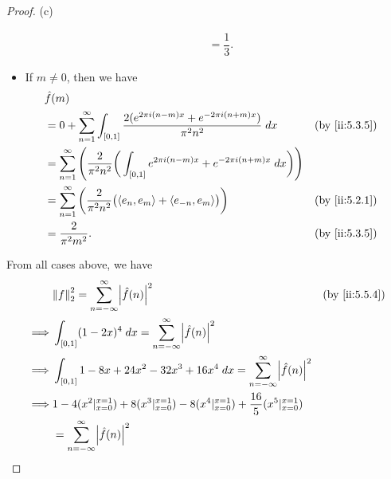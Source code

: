 \begin{proof}{(c)}
\begin{itemize}
\begin{align*}
                       & = \dfrac{1}{3}.
          \end{align*}
    \item If \(m \neq 0\), then we have
          \begin{align*}
             & \hat{f}(m)                                                                                                                                                \\
             & = 0 + \sum_{n = 1}^\infty \int_{[0, 1]} \dfrac{2 (e^{2 \pi i (n - m) x} + e^{- 2 \pi i (n + m) x})}{\pi^2 n^2} \; dx                   &  & \by{ii:5.3.5} \\
             & = \sum_{n = 1}^\infty \Bigg(\dfrac{2}{\pi^2 n^2} \bigg(\int_{[0, 1]} e^{2 \pi i (n - m) x} + e^{- 2 \pi i (n + m) x} \; dx\bigg)\Bigg)                    \\
             & = \sum_{n = 1}^\infty \bigg(\dfrac{2}{\pi^2 n^2} \big(\inner*{e_n, e_m} + \inner*{e_{-n}, e_m}\big)\bigg)                              &  & \by{ii:5.2.1} \\
             & = \dfrac{2}{\pi^2 m^2}.                                                                                                                &  & \by{ii:5.3.5}
          \end{align*}
  \end{itemize}
  From all cases above, we have
  \begin{align*}
             & \norm*{f}_2^2 = \sum_{n = -\infty}^\infty \abs{\hat{f}(n)}^2                                                                         &  & \by{ii:5.5.4}                 \\
    \implies & \int_{[0, 1]} (1 - 2x)^4 \; dx = \sum_{n = -\infty}^\infty \abs{\hat{f}(n)}^2                                                                                           \\
    \implies & \int_{[0, 1]} 1 - 8x + 24x^2 - 32x^3 + 16x^4 \; dx = \sum_{n = -\infty}^\infty \abs{\hat{f}(n)}^2                                                                       \\
    \implies & 1 - 4 (x^2|_{x = 0}^{x = 1}) + 8 (x^3|_{x = 0}^{x = 1}) - 8(x^4|_{x = 0}^{x = 1}) + \dfrac{16}{5}(x^5|_{x = 0}^{x = 1})                                                 \\
             & = \sum_{n = -\infty}^\infty \abs{\hat{f}(n)}^2                                                                                                                          \\

\end{align*}
\end{proof}
